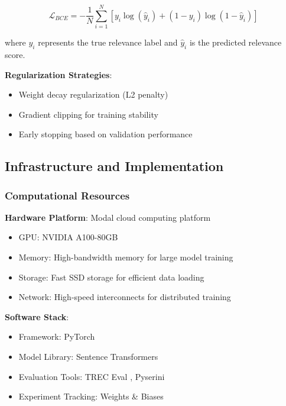 \begin{equation}
\mathcal{L}_{BCE} = -\frac{1}{N} \sum_{i=1}^{N} [y_i \log(\hat{y}_i) + (1-y_i) \log(1-\hat{y}_i)]
\end{equation}

where $y_i$ represents the true relevance label and $\hat{y}_i$ is the predicted relevance score.

\textbf{Regularization Strategies}:
\begin{itemize}
    \item Weight decay regularization (L2 penalty)
    \item Gradient clipping for training stability
    \item Early stopping based on validation performance
\end{itemize}

\subsection{Infrastructure and Implementation}

\subsubsection{Computational Resources}

\textbf{Hardware Platform}: Modal cloud computing platform \cite{modal_labs}
\begin{itemize}
    \item GPU: NVIDIA A100-80GB
    \item Memory: High-bandwidth memory for large model training
    \item Storage: Fast SSD storage for efficient data loading
    \item Network: High-speed interconnects for distributed training
\end{itemize}

\textbf{Software Stack}:
\begin{itemize}
    \item Framework: PyTorch \cite{paszke2019pytorchimperativestylehighperformance}
    \item Model Library: Sentence Transformers \cite{reimers2019sentence}
    \item Evaluation Tools: TREC Eval \cite{trec_eval_github}, Pyserini \cite{lin2021pyserini}
    \item Experiment Tracking: Weights \& Biases \cite{wandb2020}
\end{itemize}

